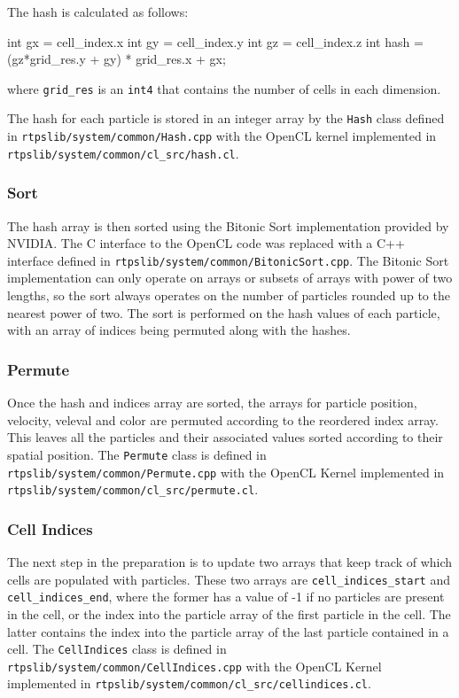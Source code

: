 The hash is calculated as follows:
\begin{cppcode}{0}
int gx = cell_index.x
int gy = cell_index.y
int gz = cell_index.z
int hash = (gz*grid_res.y + gy) * grid_res.x + gx;
\end{cppcode}
\noindent where \verb|grid_res| is an \verb|int4| that contains the number of cells in each dimension.


The hash for each particle is stored in an integer array by the \verb|Hash|
class defined in \verb|rtpslib/system/common/Hash.cpp| with the OpenCL kernel
implemented in \\ \verb|rtpslib/system/common/cl_src/hash.cl|.

\subsubsection{Sort}
The hash array is then sorted using the Bitonic Sort implementation provided by
NVIDIA\cite{NVBitonic}. The C interface to the OpenCL code was replaced with a
C++ interface defined in \verb|rtpslib/system/common/BitonicSort.cpp|. The
Bitonic Sort implementation can only operate on arrays or subsets of arrays
with power of two lengths, so the sort always operates on the number of
particles rounded up to the nearest power of two. The sort is performed on the
hash values of each particle, with an array of indices being permuted along
with the hashes.

\subsubsection{Permute}
Once the hash and indices array are sorted, the arrays for particle position,
velocity, veleval and color are permuted according to the reordered index
array. This leaves all the particles and their associated values sorted
according to their spatial position. The \verb|Permute| class is defined in
\verb|rtpslib/system/common/Permute.cpp| with the OpenCL Kernel implemented in
\verb|rtpslib/system/common/cl_src/permute.cl|.


\subsubsection{Cell Indices}
The next step in the preparation is to update two arrays that keep track of
which cells are populated with particles. These two arrays are
\verb|cell_indices_start| and \verb|cell_indices_end|, where the former has a
value of -1 if no particles are present in the cell, or the index into the
particle array of the first particle in the cell. The latter contains the index
into the particle array of the last particle contained in a cell.
The \verb|CellIndices| class is defined in
\verb|rtpslib/system/common/CellIndices.cpp| with the OpenCL Kernel implemented in
\verb|rtpslib/system/common/cl_src/cellindices.cl|.


